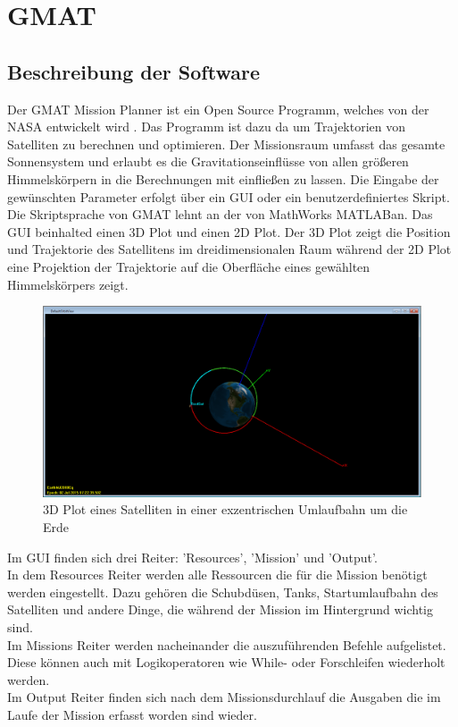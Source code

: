 			
\section{GMAT}
		\subsection{Beschreibung der Software}
		
		Der GMAT Mission Planner ist ein Open Source Programm, welches von der NASA entwickelt wird \cite{Hughes.}. Das Programm ist dazu da um Trajektorien von Satelliten zu berechnen und optimieren. Der Missionsraum umfasst das gesamte Sonnensystem und erlaubt es die Gravitationseinflüsse von allen größeren Himmelskörpern in die Berechnungen mit einfließen zu lassen. 
Die Eingabe der gewünschten Parameter erfolgt über ein GUI oder ein benutzerdefiniertes Skript. Die Skriptsprache von GMAT lehnt an der von MathWorks MATLAB\textregistered \space an.
Das GUI beinhalted einen 3D Plot und einen 2D Plot. Der 3D Plot zeigt die Position und Trajektorie des Satellitens im dreidimensionalen Raum während der 2D Plot eine Projektion der Trajektorie auf die Oberfläche eines gewählten Himmelskörpers zeigt.

\begin{figure}[!h]
	\centering
		\includegraphics[width=1.00\textwidth]{graphics/GMAT/GMAT_OrbitView2.PNG}
		\caption{3D Plot eines Satelliten in einer exzentrischen Umlaufbahn um die Erde}
			\label{fig:OrbitView2}
\end{figure}


	Im GUI finden sich drei Reiter: ’Resources’, ’Mission’ und ’Output’.\\
In dem Resources Reiter werden alle Ressourcen die für die Mission benötigt werden eingestellt. Dazu gehören die Schubdüsen, Tanks, Startumlaufbahn des Satelliten und andere Dinge, die während der Mission im Hintergrund wichtig sind.\\
Im Missions Reiter werden nacheinander die auszuführenden Befehle aufgelistet. Diese können auch mit Logikoperatoren wie While- oder Forschleifen wiederholt werden.\\
Im Output Reiter finden sich nach dem Missionsdurchlauf die Ausgaben die im Laufe der Mission erfasst worden sind wieder. 


